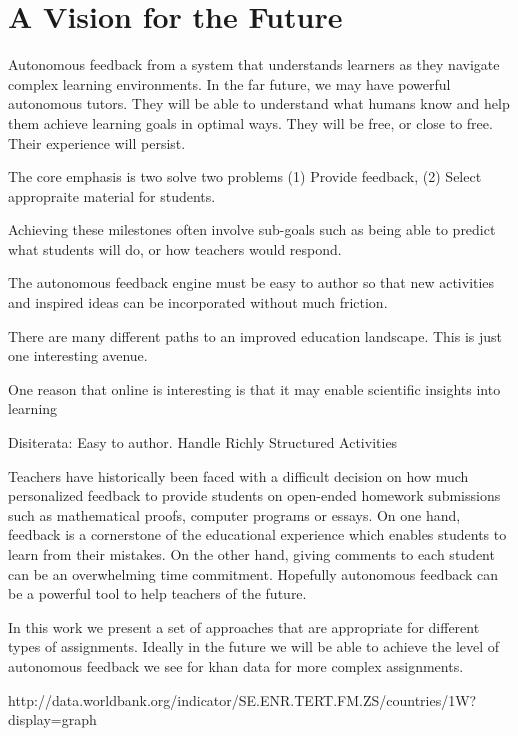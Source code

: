 \section{A Vision for the Future}
Autonomous feedback from a system that understands learners as they navigate complex learning environments.
In the far future, we may have powerful autonomous tutors. They will be able to understand what humans know and help them achieve learning goals in optimal ways. They will be free, or close to free. Their experience will persist. 

The core emphasis is two solve two problems (1) Provide feedback, (2) Select appropraite material for students. 

Achieving these milestones often involve sub-goals such as being able to predict what students will do, or how teachers would respond.

The autonomous feedback engine must be easy to author so that new activities and inspired ideas can be incorporated without much friction.

There are many different paths to an improved education landscape. This is just one interesting avenue.

One reason that online is interesting is that it may enable scientific insights into learning

Disiterata:
Easy to author.
Handle Richly Structured Activities

Teachers have historically been faced with a difficult decision on how much personalized
feedback to provide students on open-ended homework submissions
such as mathematical proofs, computer programs or essays. On one hand, feedback
is a cornerstone of the educational experience which enables students to
learn from their mistakes. On the other hand, giving comments to each student
can be an overwhelming time commitment. Hopefully autonomous feedback can be a powerful tool to help teachers of the future.

In this work we present a set of approaches that are appropriate for different types of assignments. Ideally in the future we will be able to achieve the level of autonomous feedback we see for khan data for more complex assignments. 

http://data.worldbank.org/indicator/SE.ENR.TERT.FM.ZS/countries/1W?display=graph